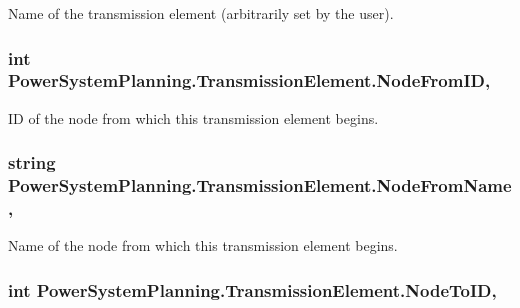 Name of the transmission element (arbitrarily set by the user). 

\subsubsection[{\texorpdfstring{Node\+From\+ID}{NodeFromID}}]{\setlength{\rightskip}{0pt plus 5cm}int Power\+System\+Planning.\+Transmission\+Element.\+Node\+From\+ID\hspace{0.3cm}{\ttfamily [get]}, {\ttfamily [set]}}\hypertarget{class_power_system_planning_1_1_transmission_element_a050027a75710ba42d4d742cf78889f29}{}\label{class_power_system_planning_1_1_transmission_element_a050027a75710ba42d4d742cf78889f29}


ID of the node from which this transmission element begins. 

\subsubsection[{\texorpdfstring{Node\+From\+Name}{NodeFromName}}]{\setlength{\rightskip}{0pt plus 5cm}string Power\+System\+Planning.\+Transmission\+Element.\+Node\+From\+Name\hspace{0.3cm}{\ttfamily [get]}, {\ttfamily [set]}}\hypertarget{class_power_system_planning_1_1_transmission_element_a6595ed8a111ff217d5437cc747b3a7c3}{}\label{class_power_system_planning_1_1_transmission_element_a6595ed8a111ff217d5437cc747b3a7c3}


Name of the node from which this transmission element begins. 

\subsubsection[{\texorpdfstring{Node\+To\+ID}{NodeToID}}]{\setlength{\rightskip}{0pt plus 5cm}int Power\+System\+Planning.\+Transmission\+Element.\+Node\+To\+ID\hspace{0.3cm}{\ttfamily [get]}, {\ttfamily [set]}}\hypertarget{class_power_system_planning_1_1_transmission_element_a670796e35f8f4af35326cfc1dd1b104f}{}\label{class_power_system_planning_1_1_transmission_element_a670796e35f8f4af35326cfc1dd1b104f}


